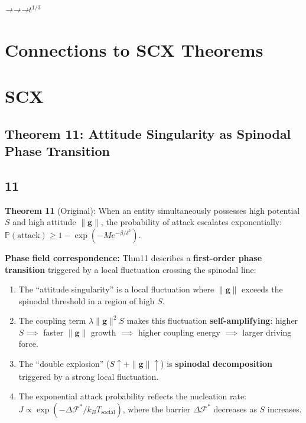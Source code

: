 \documentclass[12pt,a4paper]{article}
\theoremstyle{plain}
\theoremstyle{definition}
\newcommand{\cF}{\mathcal{F}}
\newcommand{\gf}{\mathbf{g}}          %
\newcommand{\Sf}{S}                   %
\newcommand{\cn}[1]{\textcolor{scxgray}{\textit{#1}}}
\begin{document}
\bigskip
\noindent
\cn{→→→$t^{1/3}$}

\section{Connections to SCX Theorems}
\section*{SCX}

\subsection{Theorem 11: Attitude Singularity as Spinodal Phase Transition}
\subsection*{11}

\textbf{Theorem 11} (Original): When an entity simultaneously possesses high
potential $\Sf$ and high attitude $\|\gf\|$, the probability of attack
escalates exponentially: $\mathbb{P}(\text{attack}) \geq 1 - \exp(-M e^{-\beta/\delta^2})$.

\textbf{Phase field correspondence:} Thm11 describes a \textbf{first-order
phase transition} triggered by a local fluctuation crossing the spinodal line:

\begin{enumerate}[label=(\arabic*)]
    \item The ``attitude singularity'' is a local fluctuation where $\|\gf\|$
          exceeds the spinodal threshold in a region of high $\Sf$.
    \item The coupling term $\lambda\|\gf\|^2\Sf$ makes this fluctuation
          \textbf{self-amplifying}: higher $\Sf \implies$ faster $\|\gf\|$
          growth $\implies$ higher coupling energy $\implies$ larger driving force.
    \item The ``double explosion'' ($\Sf\uparrow + \|\gf\|\uparrow$) is
          \textbf{spinodal decomposition} triggered by a strong local fluctuation.
    \item The exponential attack probability reflects the nucleation rate:
          $J \propto \exp(-\Delta\cF^*/k_B T_{\text{social}})$, where the barrier
          $\Delta\cF^*$ decreases as $\Sf$ increases.
\end{enumerate}
\end{document}
